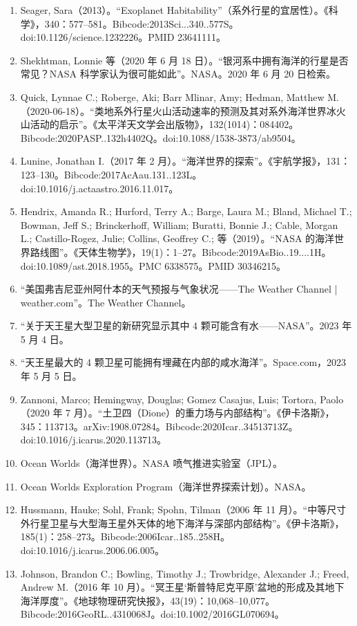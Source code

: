 \begin{enumerate}
\item Seager, Sara（2013）。“Exoplanet Habitability”（系外行星的宜居性）。《科学》，340：577–581。Bibcode:2013Sci...340..577S。doi:10.1126/science.1232226。PMID 23641111。
\item Shekhtman, Lonnie 等（2020 年 6 月 18 日）。“银河系中拥有海洋的行星是否常见？NASA 科学家认为很可能如此”。NASA。2020 年 6 月 20 日检索。
\item Quick, Lynnae C.; Roberge, Aki; Barr Mlinar, Amy; Hedman, Matthew M.（2020-06-18）。“类地系外行星火山活动速率的预测及其对系外海洋世界冰火山活动的启示”。《太平洋天文学会出版物》，132(1014)：084402。Bibcode:2020PASP..132h4402Q。doi:10.1088/1538-3873/ab9504。
\item Lunine, Jonathan I.（2017 年 2 月）。“海洋世界的探索”。《宇航学报》，131：123–130。Bibcode:2017AcAau.131..123L。doi:10.1016/j.actaastro.2016.11.017。
\item Hendrix, Amanda R.; Hurford, Terry A.; Barge, Laura M.; Bland, Michael T.; Bowman, Jeff S.; Brinckerhoff, William; Buratti, Bonnie J.; Cable, Morgan L.; Castillo-Rogez, Julie; Collins, Geoffrey C.; 等（2019）。“NASA 的海洋世界路线图”。《天体生物学》，19(1)：1–27。Bibcode:2019AsBio..19....1H。doi:10.1089/ast.2018.1955。PMC 6338575。PMID 30346215。
\item “美国弗吉尼亚州阿什本的天气预报与气象状况——The Weather Channel | weather.com”。The Weather Channel。
\item “关于天王星大型卫星的新研究显示其中 4 颗可能含有水——NASA”。2023 年 5 月 4 日。
\item “天王星最大的 4 颗卫星可能拥有埋藏在内部的咸水海洋”。Space.com，2023 年 5 月 5 日。
\item Zannoni, Marco; Hemingway, Douglas; Gomez Casajus, Luis; Tortora, Paolo（2020 年 7 月）。“土卫四（Dione）的重力场与内部结构”。《伊卡洛斯》，345：113713。arXiv:1908.07284。Bibcode:2020Icar..34513713Z。doi:10.1016/j.icarus.2020.113713。
\item Ocean Worlds（海洋世界）。NASA 喷气推进实验室（JPL）。
\item Ocean Worlds Exploration Program（海洋世界探索计划）。NASA。
\item Hussmann, Hauke; Sohl, Frank; Spohn, Tilman（2006 年 11 月）。“中等尺寸外行星卫星与大型海王星外天体的地下海洋与深部内部结构”。《伊卡洛斯》，185(1)：258–273。Bibcode:2006Icar..185..258H。doi:10.1016/j.icarus.2006.06.005。
\item Johnson, Brandon C.; Bowling, Timothy J.; Trowbridge, Alexander J.; Freed, Andrew M.（2016 年 10 月）。“冥王星‘斯普特尼克平原’盆地的形成及其地下海洋厚度”。《地球物理研究快报》，43(19)：10,068–10,077。Bibcode:2016GeoRL..4310068J。doi:10.1002/2016GL070694。

\end{enumerate}
